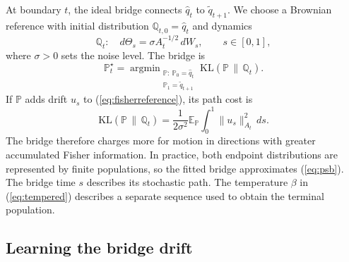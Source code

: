 At boundary $t$, the ideal bridge connects $\hat q_t$ to
$\tilde q_{t+1}$. We choose a Brownian reference with initial
distribution $\mathbb{Q}_{t,0}=\hat q_t$ and dynamics
\begin{equation}
    \mathbb{Q}_t:\quad
    d\Theta_s=\sigma A_t^{-1/2}\,dW_s,\qquad s\in[0,1],
    \label{eq:fisherreference}
\end{equation}
where $\sigma>0$ sets the noise level. The bridge is
\begin{equation}
    \mathbb{P}_t^\star=
    \mathop{\arg\min}_{\substack{\mathbb{P}:\ \mathbb{P}_0=\hat q_t\\
    \mathbb{P}_1=\tilde q_{t+1}}}
    \mathrm{KL}(\mathbb{P}\,\|\,\mathbb{Q}_t).
    \label{eq:psb}
\end{equation}
If $\mathbb{P}$ adds drift $u_s$ to (\ref{eq:fisherreference}), its path
cost is
\begin{equation}
    \mathrm{KL}(\mathbb{P}\,\|\,\mathbb{Q}_t)
    =\frac{1}{2\sigma^2}\mathbb{E}_{\mathbb{P}}
    \int_0^1\|u_s\|_{A_t}^{2}\,ds.
    \label{eq:fishercost}
\end{equation}
The bridge therefore charges more for motion in directions with greater
accumulated Fisher information. In practice, both endpoint distributions
are represented by finite populations, so the fitted bridge approximates
(\ref{eq:psb}). The bridge time $s$ describes its stochastic path. The
temperature $\beta$ in (\ref{eq:tempered}) describes a separate sequence
used to obtain the terminal population.

\subsection{Learning the bridge drift}
\label{sec:drift}

